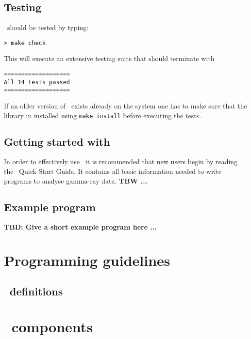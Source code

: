 \documentclass{article}[12pt,a4]
\begin{document}
\subsection{Testing \this}

\this\ should be tested by typing:
\begin{verbatim}
> make check
\end{verbatim}
This will execute an extensive testing suite that should terminate with
\begin{verbatim}
===================
All 14 tests passed
===================
\end{verbatim}
If an older version of \this\ exists already on the system one has to make sure that the
library in installed using {\tt make install} before executing the tests.


\subsection{Getting started with \this}

In order to effectively use \this\ it is recommended that new users begin by reading the
\this\ Quick Start Guide.
It contains all basic information needed to write programs to analyse gamma-ray data.
{\bf TBW ...}


\subsection{Example program}

{\bf TBD: Give a short example program here ...}


\section{Programming guidelines}

\subsection{\this\ definitions}


\section{\this\ components}
\end{document}
